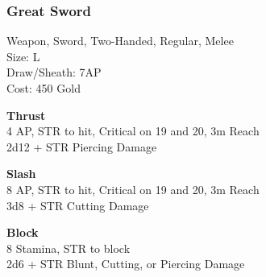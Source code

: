 \subsubsection{Great Sword}\label{weapon:greatSword}
Weapon, Sword, Two-Handed, Regular, Melee\\
Size: L\\
Draw/Sheath: 7AP\\
Cost: 450 Gold

\textbf{Thrust}\\
4 AP, STR to hit, Critical on 19 and 20, 3m Reach\\
2d12 + \texttimes STR Piercing Damage

\textbf{Slash}\\
8 AP, STR to hit, Critical on 19 and 20, 3m Reach\\
3d8 + \texttimes STR Cutting Damage

\textbf{Block}\\
8 Stamina, STR to block\\
2d6 + \texttimes STR Blunt, Cutting, or Piercing Damage
